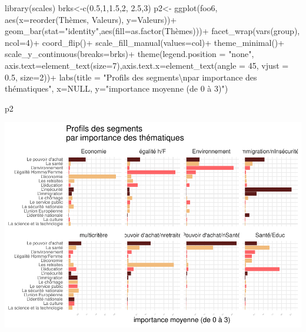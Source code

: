 \documentclass[
]{book}
\newenvironment{Shaded}{\begin{snugshade}}{\end{snugshade}}
\newcommand{\AttributeTok}[1]{\textcolor[rgb]{0.77,0.63,0.00}{#1}}
\newcommand{\ConstantTok}[1]{\textcolor[rgb]{0.00,0.00,0.00}{#1}}
\newcommand{\DecValTok}[1]{\textcolor[rgb]{0.00,0.00,0.81}{#1}}
\newcommand{\FloatTok}[1]{\textcolor[rgb]{0.00,0.00,0.81}{#1}}
\newcommand{\FunctionTok}[1]{\textcolor[rgb]{0.00,0.00,0.00}{#1}}
\newcommand{\NormalTok}[1]{#1}
\newcommand{\OtherTok}[1]{\textcolor[rgb]{0.56,0.35,0.01}{#1}}
\newcommand{\SpecialCharTok}[1]{\textcolor[rgb]{0.00,0.00,0.00}{#1}}
\newcommand{\StringTok}[1]{\textcolor[rgb]{0.31,0.60,0.02}{#1}}
\begin{document}
\begin{Shaded}
\begin{Highlighting}[]
\FunctionTok{library}\NormalTok{(scales)}
\NormalTok{brks}\OtherTok{\textless{}{-}}\FunctionTok{c}\NormalTok{(}\FloatTok{0.5}\NormalTok{,}\DecValTok{1}\NormalTok{,}\FloatTok{1.5}\NormalTok{,}\DecValTok{2}\NormalTok{, }\FloatTok{2.5}\NormalTok{,}\DecValTok{3}\NormalTok{)}
\NormalTok{p2}\OtherTok{\textless{}{-}} \FunctionTok{ggplot}\NormalTok{(foo6, }\FunctionTok{aes}\NormalTok{(}\AttributeTok{x=}\FunctionTok{reorder}\NormalTok{(Thèmes, Valeurs), }\AttributeTok{y=}\NormalTok{Valeurs))}\SpecialCharTok{+}
  \FunctionTok{geom\_bar}\NormalTok{(}\AttributeTok{stat=}\StringTok{"identity"}\NormalTok{,}\FunctionTok{aes}\NormalTok{(}\AttributeTok{fill=}\FunctionTok{as.factor}\NormalTok{(Thèmes)))}\SpecialCharTok{+}
  \FunctionTok{facet\_wrap}\NormalTok{(}\FunctionTok{vars}\NormalTok{(group), }\AttributeTok{ncol=}\DecValTok{4}\NormalTok{)}\SpecialCharTok{+}
  \FunctionTok{coord\_flip}\NormalTok{()}\SpecialCharTok{+}
  \FunctionTok{scale\_fill\_manual}\NormalTok{(}\AttributeTok{values=}\NormalTok{col)}\SpecialCharTok{+}
  \FunctionTok{theme\_minimal}\NormalTok{()}\SpecialCharTok{+}
  \FunctionTok{scale\_y\_continuous}\NormalTok{(}\AttributeTok{breaks=}\NormalTok{brks)}\SpecialCharTok{+} 
  \FunctionTok{theme}\NormalTok{(}\AttributeTok{legend.position =} \StringTok{"none"}\NormalTok{, }\AttributeTok{axis.text=}\FunctionTok{element\_text}\NormalTok{(}\AttributeTok{size=}\DecValTok{7}\NormalTok{),}\AttributeTok{axis.text.x=}\FunctionTok{element\_text}\NormalTok{(}\AttributeTok{angle =} \DecValTok{45}\NormalTok{, }\AttributeTok{vjust =} \FloatTok{0.5}\NormalTok{, }\AttributeTok{size=}\DecValTok{2}\NormalTok{))}\SpecialCharTok{+} 
  \FunctionTok{labs}\NormalTok{(}\AttributeTok{title =} \StringTok{"Profils des segments}\SpecialCharTok{\textbackslash{}n}\StringTok{par importance des thématiques"}\NormalTok{, }\AttributeTok{x=}\ConstantTok{NULL}\NormalTok{, }\AttributeTok{y=}\StringTok{"importance moyenne (de 0 à 3)"}\NormalTok{) }

\NormalTok{p2}
\end{Highlighting}
\end{Shaded}

\includegraphics{bookdown-demo_files/figure-latex/0815-1.pdf}
\end{document}
